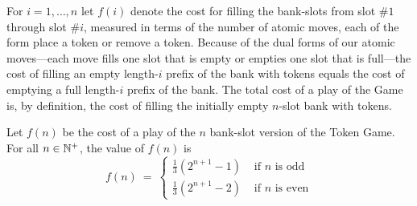 For $i = 1, \ldots, n$ let $f(i)$ denote the cost for filling the
bank-slots from slot \#$1$ through slot \#$i$, measured in terms of
the number of atomic moves, each of the form {\sc place a token} or
{\sc remove a token}.  Because of the dual forms of our atomic
moves---each move fills one slot that is empty or empties one slot
that is full---the cost of filling an empty length-$i$ prefix of the
bank with tokens equals the cost of emptying a full length-$i$ prefix
of the bank.  The total cost of a play of the Game is, by definition,
the cost of filling the initially empty $n$-slot bank with tokens.

\begin{prop}
\label{thm:f-cost of TokenGame}
Let $f(n)$ be the cost of a play of the $n$ bank-slot version of the
Token Game.  For all $n \in \mathbb{N}^+$, the value of $f(n)$ is
\begin{equation}
\label{eq:f-cost:Token-Game}
f(n) \ = \ \left\{
\begin{array}{ll}
 \frac{1}{3} \left( 2^{n+1} -1 \right)
  & \mbox{  if $n$ is odd} \\
 \frac{1}{3} \left( 2^{n+1} -2 \right)
  & \mbox{  if $n$ is even}
\end{array}
\right.
\end{equation}
\end{prop}

